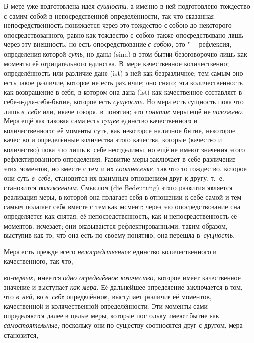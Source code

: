 В мере уже подготовлена идея {\em сущности,} а именно в ней подготовлено
тождество с самим собой в непосредственной определённости, так что сказанная
непосредственность понижается через это тождество с собою до некоторого
опосредствованного, равно как тождество с собою также опосредствовано лишь
через эту внешность, но есть опосредствование {\em с собою;} это "---
рефлексия, определения которой {\em суть,} но даны (sind) в этом бытии
безоговорочно лишь как моменты её отрицательного единства. В~мере качественное
количественно; определённость или различие дано (ist) в ней как безразличное;
тем самым оно есть такое различие, которое не есть различие; оно снято; эта
количественность как возвращение в себя, в котором она дана (ist) как
качественное составляет в-себе-и-для-себя-бытие, которое есть {\em сущность}.
Но мера есть сущность пока что лишь {\em в~себе} или, иначе говоря, в понятии;
это {\em понятие} меры ещё не {\em положено}. Мера ещё как таковая сама есть
{\em сущее} единство качественного и количественного; её моменты суть, как
некоторое наличное бытие, некоторое качество и определённые количества этого
качества, которые (качество и количество) пока что лишь в~себе неотделимы, но
ещё не имеют значения этого рефлектированного определения. Развитие меры
заключает в себе различение этих моментов, но вместе с тем и их
{\em соотнесение,} так что то тождество, которое они суть {\em в~себе,}
становится их взаимным отношением друг к другу, т.~е. становится
{\em положенным}. Смыслом (die Bedeutung) этого развития является реализация
меры, в которой она полагает себя в отношении к себе самой и тем самым полагает
себя вместе с тем как момент; через это опосредствование она определяется как
снятая; её непосредственность, как и непосредственность её моментов, исчезает;
они оказываются рефлектированными; таким образом, выступив как то, чт\'{о} она
есть по своему понятию, она перешла в~{\em сущность}.

Мера есть прежде всего {\em непосредственное} единство количественного
и качественного, так что,

{\em во-первых,} имеется {\em одно определённое количество,} которое имеет
качественное значение и выступает {\em как мера}. Её дальнейшее определение
заключается в том, что {\em в~ней,} во {\em в~себе} определённом, выступает
различие её моментов, качественной и количественной определённости. Эти моменты
сами определяются далее в целые меры, которые постольку имеют бытие как
{\em самостоятельные;} поскольку они по существу соотносятся друг с другом,
мера становится,


